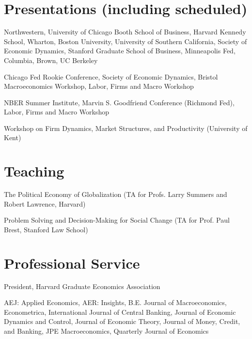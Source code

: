\documentclass[letterpaper]{article}
\def\footerlink{http://jblevins.org/projects/cv-template/}
\begin{document}
\section*{Presentations (including scheduled)}
\begin{description}[labelindent=0pt, labelwidth=1in, labelsep*=1em, leftmargin =!, font=\normalfont]
\item[2024] Northwestern, University of Chicago Booth School of Business, Harvard Kennedy School, Wharton, Boston University, University of Southern California, Society of Economic Dynamics, Stanford Graduate School of Business, Minneapolis Fed, Columbia, Brown, UC Berkeley %
\item[2023] Chicago Fed Rookie Conference, Society of Economic Dynamics, Bristol Macroeconomics Workshop, Labor, Firms and Macro Workshop
\item[2022] NBER Summer Institute, Marvin S. Goodfriend Conference (Richmond Fed), Labor, Firms and Macro Workshop
\item[2021] Workshop on Firm Dynamics, Market Structures, and Productivity (University of Kent) 
\end{description}

\section*{Teaching}
\begin{description}[labelindent=0pt, labelwidth=1in, labelsep*=1em, leftmargin =!, font=\normalfont]
\item[2021] The Political Economy of Globalization (TA for Profs. Larry Summers and Robert Lawrence, Harvard) 
\item[2015] Problem Solving and Decision-Making for Social Change (TA for Prof. Paul Brest, Stanford Law School)
\end{description}

\section*{Professional Service}
\begin{description}[labelindent=0pt, labelwidth=1in, labelsep*=1em, leftmargin =!, font=\normalfont]
\item[2021--2021] President, Harvard Graduate Economics Association
\item[Refereeing] {AEJ: Applied Economics, AER: Insights, B.E. Journal of Macroeconomics, Econometrica, International Journal of Central Banking, Journal of Economic Dynamics and Control, Journal of Economic Theory, Journal of Money, Credit, and Banking, JPE Macroeconomics, Quarterly Journal of Economics}
\end{description}


\end{document}
